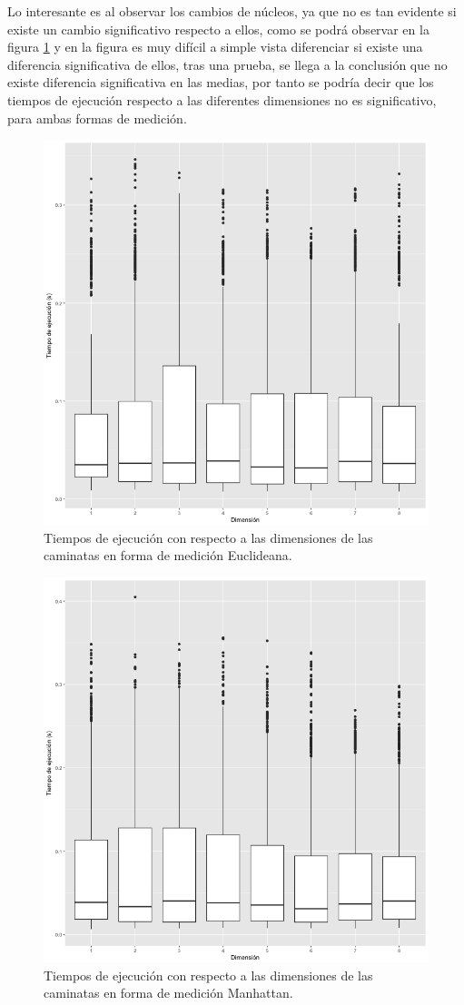 \documentclass[a4paper]{article}
\begin{document}
Lo interesante es al observar los cambios de núcleos, ya que no es tan evidente si existe un cambio significativo respecto a ellos, como se podrá observar en la figura \ref{fig:DimEu} y en la figura  es muy difícil a simple vista diferenciar si existe una diferencia significativa de ellos, tras una prueba, se llega a la conclusión que no existe diferencia significativa en las medias, por tanto se podría decir que los tiempos de ejecución respecto a las diferentes dimensiones no es significativo, para ambas formas de medición.

\begin{figure}[h]
\centering
\includegraphics[width=0.7\linewidth]{DimEu}
\caption{Tiempos de ejecución con respecto a las dimensiones de las caminatas en forma de medición Euclideana.}
\label{fig:DimEu}
\end{figure}

\begin{figure}[h]
\centering
\includegraphics[width=0.7\linewidth]{DimMa}
\caption{Tiempos de ejecución con respecto a las dimensiones de las caminatas en forma de medición Manhattan.}
\label{fig:DimMa}
\end{figure}
\end{document}
